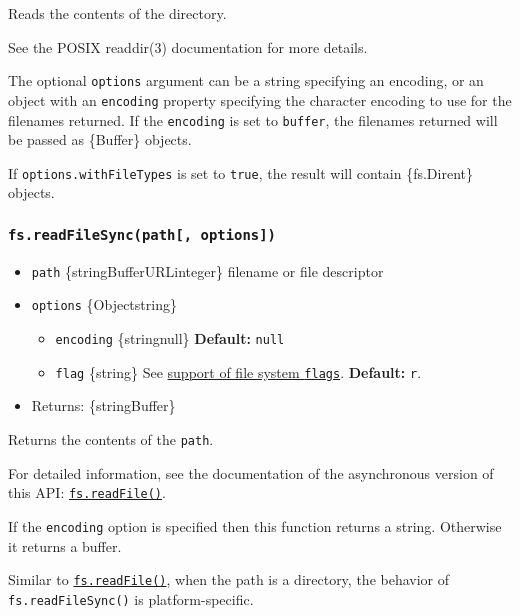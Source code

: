 Reads the contents of the directory.

See the POSIX readdir(3) documentation for more details.

The optional \texttt{options} argument can be a string specifying an
encoding, or an object with an \texttt{encoding} property specifying the
character encoding to use for the filenames returned. If the
\texttt{encoding} is set to
\texttt{\textquotesingle{}buffer\textquotesingle{}}, the filenames
returned will be passed as \{Buffer\} objects.

If \texttt{options.withFileTypes} is set to \texttt{true}, the result
will contain \{fs.Dirent\} objects.

\subsubsection{\texorpdfstring{\texttt{fs.readFileSync(path{[},\ options{]})}}{fs.readFileSync(path{[}, options{]})}}\label{fs.readfilesyncpath-options}

\begin{itemize}
\tightlist
\item
  \texttt{path} \{string\textbar Buffer\textbar URL\textbar integer\}
  filename or file descriptor
\item
  \texttt{options} \{Object\textbar string\}

  \begin{itemize}
  \tightlist
  \item
    \texttt{encoding} \{string\textbar null\} \textbf{Default:}
    \texttt{null}
  \item
    \texttt{flag} \{string\} See \hyperref[file-system-flags]{support of
    file system \texttt{flags}}. \textbf{Default:}
    \texttt{\textquotesingle{}r\textquotesingle{}}.
  \end{itemize}
\item
  Returns: \{string\textbar Buffer\}
\end{itemize}

Returns the contents of the \texttt{path}.

For detailed information, see the documentation of the asynchronous
version of this API:
\hyperref[fsreadfilepath-options-callback]{\texttt{fs.readFile()}}.

If the \texttt{encoding} option is specified then this function returns
a string. Otherwise it returns a buffer.

Similar to
\hyperref[fsreadfilepath-options-callback]{\texttt{fs.readFile()}}, when
the path is a directory, the behavior of \texttt{fs.readFileSync()} is
platform-specific.

